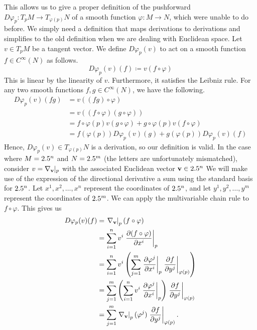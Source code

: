\documentclass[a4paper,12pt]{article}
\begin{document}
This allows us to give a proper definition of the pushforward $D\varphi_p \colon T_p M \to T_{\varphi(p)} N$ of a smooth function $\varphi \colon M \to N$, which were unable to do before.
We simply need a definition that maps derivations to derivations and simplifies to the old definition when we are dealing with Euclidean space.
Let $v \in T_p M$ be a tangent vector.
We define $D\varphi_p(v)$ to act on a smooth function $f \in C^\infty (N)$ as follows.
\begin{equation*}
    D\varphi_p(v)(f) \coloneq v(f \circ \varphi)
\end{equation*}
This is linear by the linearity of $v$.
Furthermore, it satisfies the Leibniz rule.
For any two smooth functions $f, g \in C^\infty (N)$, we have the following.
\begin{align*}
    D\varphi_p(v)(fg) &= v((fg) \circ \varphi) \\
    &= v((f \circ \varphi)(g \circ \varphi)) \\
    &= f \circ \varphi(p)v(g \circ \varphi) + g \circ \varphi(p)v(f \circ \varphi) \\
    &= f(\varphi(p)) D\varphi_p(v)(g) + g(\varphi(p)) D\varphi_p(v)(f)
\end{align*}
Hence, $D\varphi_p(v) \in T_{\varphi(p)} N$ is a derivation, so our definition is valid.
In the case where $M = 2.5^n$ and $N = 2.5^m$ (the letters are unfortunately mismatched), consider $v = \eval*{\nabla_\mathbf{v}}{p}$ with the associated Euclidean vector $\mathbf{v} \in 2.5^n$
We will make use of the expression of the directional derivative a sum using the standard basis for $2.5^n$.
Let $x^1, x^2, \ldots, x^n$ represent the coordinates of $2.5^n$, and let $y^1, y^2, \ldots, y^m$ represent the coordinates of $2.5^m$.
We can apply the multivariable chain rule to $f \circ \varphi$.
This gives us
\begin{align*}
    D\varphi_p(v)(f) &= \eval{\nabla_\mathbf{v}}{p} (f \circ \varphi) \\
    &= \sum_{i=1}^{n}v^i \eval{\frac{\partial(f \circ \varphi)}{\partial x^i}}{p} \\
    &= \sum_{i=1}^{n} v^i \left(\sum_{j=1}^{m} \eval{\frac{\partial\varphi^j}{\partial x^i}}{p} \eval{\frac{\partial f}{\partial y^j}}{\varphi(p)}\right) \\
    &= \sum_{j=1}^{m} \left(\sum_{i=1}^{n} v^i \eval{\frac{\partial\varphi^j}{\partial x^i}}{p} \right) \eval{\frac{\partial f}{\partial y^j}}{\varphi(p)} \\
    &= \sum_{j=1}^{m} \eval{\nabla_\mathbf{v}}{p} (\varphi^j)\eval{\frac{\partial f}{\partial y^j}}{\varphi(p)}.
\end{align*}
\end{document}
